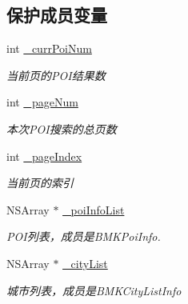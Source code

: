 \subsection*{保护成员变量}
\begin{DoxyCompactItemize}
\item 
\hypertarget{interface_b_m_k_poi_result_a734c9424931aaa457069c0179c22d307}{int \hyperlink{interface_b_m_k_poi_result_a734c9424931aaa457069c0179c22d307}{\-\_\-curr\-Poi\-Num}}\label{interface_b_m_k_poi_result_a734c9424931aaa457069c0179c22d307}

\begin{DoxyCompactList}\small\item\em 当前页的\-P\-O\-I结果数 \end{DoxyCompactList}\item 
\hypertarget{interface_b_m_k_poi_result_a5831f7fc7e978e04e58fe9f3a1da0fd7}{int \hyperlink{interface_b_m_k_poi_result_a5831f7fc7e978e04e58fe9f3a1da0fd7}{\-\_\-page\-Num}}\label{interface_b_m_k_poi_result_a5831f7fc7e978e04e58fe9f3a1da0fd7}

\begin{DoxyCompactList}\small\item\em 本次\-P\-O\-I搜索的总页数 \end{DoxyCompactList}\item 
\hypertarget{interface_b_m_k_poi_result_a0b75833625c93cd9c4d4fc225324cee1}{int \hyperlink{interface_b_m_k_poi_result_a0b75833625c93cd9c4d4fc225324cee1}{\-\_\-page\-Index}}\label{interface_b_m_k_poi_result_a0b75833625c93cd9c4d4fc225324cee1}

\begin{DoxyCompactList}\small\item\em 当前页的索引 \end{DoxyCompactList}\item 
\hypertarget{interface_b_m_k_poi_result_a25244becb10392bdb2d9d781d357208d}{N\-S\-Array $\ast$ \hyperlink{interface_b_m_k_poi_result_a25244becb10392bdb2d9d781d357208d}{\-\_\-poi\-Info\-List}}\label{interface_b_m_k_poi_result_a25244becb10392bdb2d9d781d357208d}

\begin{DoxyCompactList}\small\item\em P\-O\-I列表，成员是\-B\-M\-K\-Poi\-Info. \end{DoxyCompactList}\item 
\hypertarget{interface_b_m_k_poi_result_acf4e2c4c0040c79368d2da36bfd7c092}{N\-S\-Array $\ast$ \hyperlink{interface_b_m_k_poi_result_acf4e2c4c0040c79368d2da36bfd7c092}{\-\_\-city\-List}}\label{interface_b_m_k_poi_result_acf4e2c4c0040c79368d2da36bfd7c092}

\begin{DoxyCompactList}\small\item\em 城市列表，成员是\-B\-M\-K\-City\-List\-Info \end{DoxyCompactList}\end{DoxyCompactItemize}
